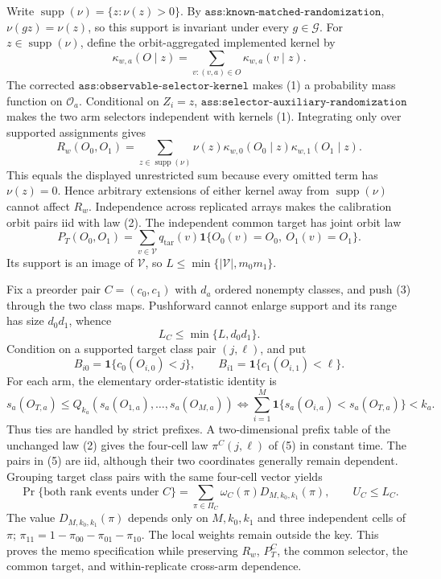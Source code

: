 Write \(\operatorname{supp}(\nu)=\{z:\nu(z)>0\}\). By \(\texttt{ass:known-matched-randomization}\), \(\nu(gz)=\nu(z)\), so this support is invariant under every \(g\in\mathcal G\). For \(z\in\operatorname{supp}(\nu)\), define the orbit-aggregated implemented kernel by
\[
\kappa_{w,a}(O\mid z)=\sum_{v:(v,a)\in O}\kappa_{w,a}(v\mid z).
\tag{1}
\]
The corrected \(\texttt{ass:observable-selector-kernel}\) makes (1) a probability mass function on \(\mathcal O_a\). Conditional on \(Z_i=z\), \(\texttt{ass:selector-auxiliary-randomization}\) makes the two arm selectors independent with kernels (1). Integrating only over supported assignments gives
\[
R_w(O_0,O_1)=\sum_{z\in\operatorname{supp}(\nu)}\nu(z)
\kappa_{w,0}(O_0\mid z)\kappa_{w,1}(O_1\mid z).
\tag{2}
\]
This equals the displayed unrestricted sum because every omitted term has \(\nu(z)=0\). Hence arbitrary extensions of either kernel away from \(\operatorname{supp}(\nu)\) cannot affect \(R_w\). Independence across replicated arrays makes the calibration orbit pairs iid with law (2). The independent common target has joint orbit law
\[
P_T(O_0,O_1)=\sum_{v\in\mathcal V}q_{\mathrm{tar}}(v)
\mathbf 1\{O_0(v)=O_0,\ O_1(v)=O_1\}.
\tag{3}
\]
Its support is an image of \(\mathcal V\), so \(L\le\min\{|\mathcal V|,m_0m_1\}\).

Fix a preorder pair \(C=(c_0,c_1)\) with \(d_a\) ordered nonempty classes, and push (3) through the two class maps. Pushforward cannot enlarge support and its range has size \(d_0d_1\), whence
\[
L_C\le\min\{L,d_0d_1\}.
\tag{4}
\]
Condition on a supported target class pair \((j,\ell)\), and put
\[
B_{i0}=\mathbf 1\{c_0(O_{i,0})<j\},\qquad
B_{i1}=\mathbf 1\{c_1(O_{i,1})<\ell\}.
\tag{5}
\]
For each arm, the elementary order-statistic identity is
\[
s_a(O_{T,a})\le Q_{k_a}(s_a(O_{1,a}),\ldots,s_a(O_{M,a}))
\Longleftrightarrow
\sum_{i=1}^M\mathbf 1\{s_a(O_{i,a})<s_a(O_{T,a})\}<k_a.
\tag{6}
\]
Thus ties are handled by strict prefixes. A two-dimensional prefix table of the unchanged law (2) gives the four-cell law \(\pi^C(j,\ell)\) of (5) in constant time. The pairs in (5) are iid, although their two coordinates generally remain dependent. Grouping target class pairs with the same four-cell vector yields
\[
\Pr\{\text{both rank events under }C\}
=\sum_{\pi\in\Pi_C}\omega_C(\pi)D_{M,k_0,k_1}(\pi),
\qquad U_C\le L_C.
\tag{7}
\]
The value \(D_{M,k_0,k_1}(\pi)\) depends only on \(M,k_0,k_1\) and three independent cells of \(\pi\); \(\pi_{11}=1-\pi_{00}-\pi_{01}-\pi_{10}\). The local weights remain outside the key. This proves the memo specification while preserving \(R_w\), \(P_T^C\), the common selector, the common target, and within-replicate cross-arm dependence.

